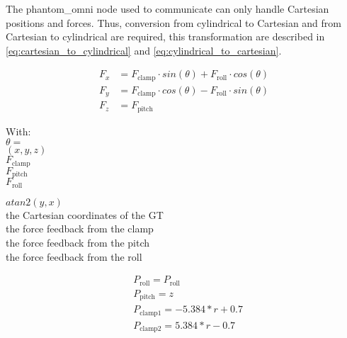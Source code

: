 The phantom\_omni node\cite{phantom_omni_github} used to communicate can only handle Cartesian positions and forces. Thus, conversion from cylindrical to Cartesian and from Cartesian to cylindrical are required, this transformation are described in \eqref{eq:cartesian_to_cylindrical} and \eqref{eq:cylindrical_to_cartesian}.



\begin{equation} 
\begin{split}
	F_x &= F_\textrm{clamp}\cdot sin(\theta) + F_\textrm{roll}\cdot cos(\theta)\\
	F_y &= F_\textrm{clamp}\cdot cos(\theta) - F_\textrm{roll}\cdot sin(\theta)\\
	F_z &= F_\textrm{pitch}
\end{split}
\label{eq:cylindrical_to_cartesian}
\end{equation}

\begin{minipage}[t]{0.20\textwidth}
With:\\
\hspace*{8mm} $\theta = $\\
\hspace*{8mm} $(x,y,z)$ \\
\hspace*{8mm} $F_\textrm{clamp}$ \\
\hspace*{8mm} $F_\textrm{pitch}$ \\
\hspace*{8mm} $F_\textrm{roll}$ 
\end{minipage}
\begin{minipage}[t]{0.68\textwidth}
\vspace*{2mm}
$atan2(y,x)$\\
the Cartesian coordinates of the GT\\
the force feedback from the clamp\\
the force feedback from the pitch\\
the force feedback from the roll
\end{minipage}

\begin{equation} 
\begin{split}
	&P_\textrm{roll} = P_\textrm{roll}\\
	&P_\textrm{pitch} = z\\
	&P_\textrm{clamp1} = -5.384*r + 0.7\\
	&P_\textrm{clamp2} = 5.384*r - 0.7
\end{split}
\label{eq:cartesian_to_cylindrical}
\end{equation}

